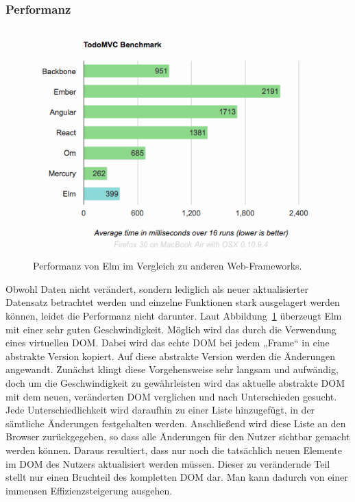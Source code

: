 \subsubsection{Performanz}
\label{sec:Performanz}
\begin{figure}
  \centering  
  \includegraphics[scale=0.6]{img/virtual-dom.png}
  \caption{Performanz von Elm im Vergleich zu anderen Web-Frameworks. \cite{elm-performance}}\label{fig:performance}
\end{figure}
Obwohl Daten nicht verändert, sondern lediglich als neuer aktualisierter Datensatz betrachtet werden und einzelne Funktionen stark ausgelagert werden können, leidet die Performanz nicht darunter. Laut Abbildung~\ref{fig:performance} überzeugt Elm mit einer sehr guten Geschwindigkeit. Möglich wird das durch die Verwendung eines virtuellen \ac{DOM}.
Dabei wird das echte \ac{DOM} bei jedem „Frame“ in eine abstrakte Version kopiert. Auf diese abstrakte Version werden die Änderungen angewandt. Zunächst klingt diese Vorgehensweise sehr langsam und aufwändig, doch um die Geschwindigkeit zu gewährleisten wird das aktuelle abstrakte \ac{DOM} mit dem neuen, veränderten \ac{DOM} verglichen und nach Unterschieden gesucht. Jede Unterschiedlichkeit wird daraufhin zu einer Liste hinzugefügt, in der sämtliche Änderungen festgehalten werden. Anschließend wird diese Liste an den Browser zurückgegeben, so dass alle Änderungen für den Nutzer sichtbar gemacht werden können. Daraus resultiert, dass nur noch die tatsächlich neuen Elemente im \ac{DOM} des Nutzers aktualisiert werden müssen. Dieser zu verändernde Teil stellt nur einen Bruchteil des kompletten \ac{DOM} dar. Man kann dadurch von einer immensen Effizienzsteigerung ausgehen.


